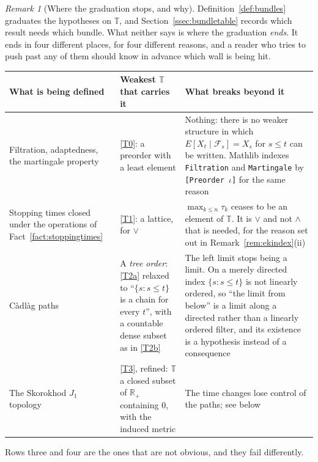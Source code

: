 \documentclass[11pt,a4paper]{article}
\theoremstyle{plain}
\theoremstyle{definition}
\theoremstyle{remark}
\newtheorem{remark}[theorem]{Remark}
\newcommand{\R}{\mathbb{R}}
\newcommand{\Rp}{\R_+}
\newcommand{\T}{\mathbb{T}}                     %
\newcommand{\Filt}{\mathcal{F}}
\begin{document}
\begin{remark}[Where the graduation stops, and why]
  \label{rem:graduation}
  Definition~\ref{def:bundles} graduates the hypotheses on $\T$, and
  Section~\ref{ssec:bundletable} records which result needs which bundle.  What
  neither says is where the graduation \emph{ends}.  It ends in four different
  places, for four different reasons, and a reader who tries to push past any of
  them should know in advance which wall is being hit.

  \medskip
  \noindent
  \begin{tabular}{@{}p{}p{}p{}@{}}
    \toprule
    \textbf{What is being defined} & \textbf{Weakest $\T$ that carries it}
      & \textbf{What breaks beyond it} \\
    \midrule
    Filtration, adaptedness, the martingale property
      & \eqref{T0}: a preorder with a least element
      & Nothing: there is no weaker structure in which
        $E[X_t \mid \Filt_s] = X_s$ for $s \leq t$ can be written.  Mathlib
        indexes \texttt{Filtration} and \texttt{Martingale} by
        \texttt{[Preorder }$\iota$\texttt{]} for the same reason \\[0.6ex]
    Stopping times closed under the operations of Fact~\ref{fact:stoppingtimes}
      & \eqref{T1}: a lattice, for $\vee$
      & $\max_{k \leq n} \tau_k$ ceases to be an element of $\T$.  It is $\vee$
        and not $\wedge$ that is needed, for the reason set out in
        Remark~\ref{rem:ekindex}(ii) \\[0.6ex]
    C\`adl\`ag paths
      & A \emph{tree order}: \eqref{T2a} relaxed to ``$\{s : s \leq t\}$ is a
        chain for every $t$'', with a countable dense subset as in \eqref{T2b}
      & The left limit stops being a limit.  On a merely directed index
        $\{s : s \leq t\}$ is not linearly ordered, so ``the limit from below''
        is a limit along a directed rather than a linearly ordered filter, and
        its existence is a hypothesis instead of a consequence \\[0.6ex]
    The Skorokhod $J_1$ topology
      & \eqref{T3}, refined: $\T$ a closed subset of $\Rp$ containing $0$, with
        the induced metric
      & The time changes lose control of the paths; see below \\
    \bottomrule
  \end{tabular}

  \medskip
  Rows three and four are the ones that are not obvious, and they fail
  differently.


\end{remark}
\end{document}
